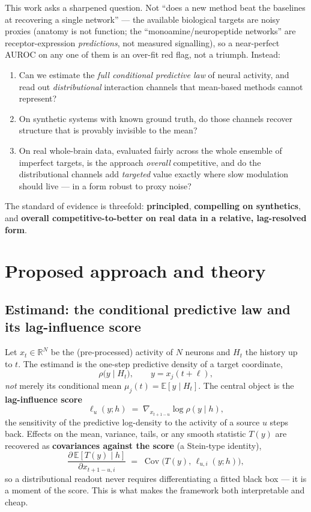 \documentclass[11pt]{article}
\newcommand{\Hcal}{H}
\newcommand{\Cov}{\operatorname{Cov}}
\newcommand{\R}{\mathbb{R}}
\newcommand{\E}{\mathbb{E}}
\begin{document}
This work asks a sharpened question. Not ``does a new method beat the baselines at recovering a
single network'' --- the available biological targets are noisy proxies (anatomy is not function;
the ``monoamine/neuropeptide networks'' are receptor-expression \emph{predictions}, not measured
signalling), so a near-perfect AUROC on any one of them is an over-fit red flag, not a triumph.
Instead:
\begin{enumerate}[topsep=2pt,itemsep=1pt]
  \item Can we estimate the \emph{full conditional predictive law} of neural activity, and read out
        \emph{distributional} interaction channels that mean-based methods cannot represent?
  \item On synthetic systems with known ground truth, do those channels recover structure that is
        provably invisible to the mean?
  \item On real whole-brain data, evaluated fairly across the whole ensemble of imperfect targets,
        is the approach \emph{overall} competitive, and do the distributional channels add
        \emph{targeted} value exactly where slow modulation should live --- in a form robust to
        proxy noise?
\end{enumerate}
The standard of evidence is threefold: \textbf{principled}, \textbf{compelling on synthetics}, and
\textbf{overall competitive-to-better on real data in a relative, lag-resolved form}.

\section{Proposed approach and theory}
\label{sec:theory}

\subsection{Estimand: the conditional predictive law and its lag-influence score}
Let $x_t\in\R^N$ be the (pre-processed) activity of $N$ neurons and $\Hcal_t$ the history up to $t$.
The estimand is the one-step predictive density of a target coordinate,
\[
  \rho\bigl(y \mid \Hcal_t\bigr), \qquad y = x_{j}(t{+}\ell),
\]
\emph{not} merely its conditional mean $\mu_j(t)=\E[y\mid\Hcal_t]$. The central object is the
\textbf{lag-influence score}
\[
  \ell_u(y;h) \;=\; \nabla_{x_{t+1-u}}\log\rho(y\mid h),
\]
the sensitivity of the predictive log-density to the activity of a source $u$ steps back. Effects on
the mean, variance, tails, or any smooth statistic $T(y)$ are recovered as \textbf{covariances
against the score} (a Stein-type identity),
\[
  \frac{\partial\,\E[T(y)\mid h]}{\partial x_{t+1-u,i}}
  \;=\; \Cov\!\bigl(T(y),\,\ell_{u,i}(y;h)\bigr),
\]
so a distributional readout never requires differentiating a fitted black box --- it is a moment of
the score. This is what makes the framework both interpretable and cheap.
\end{document}
